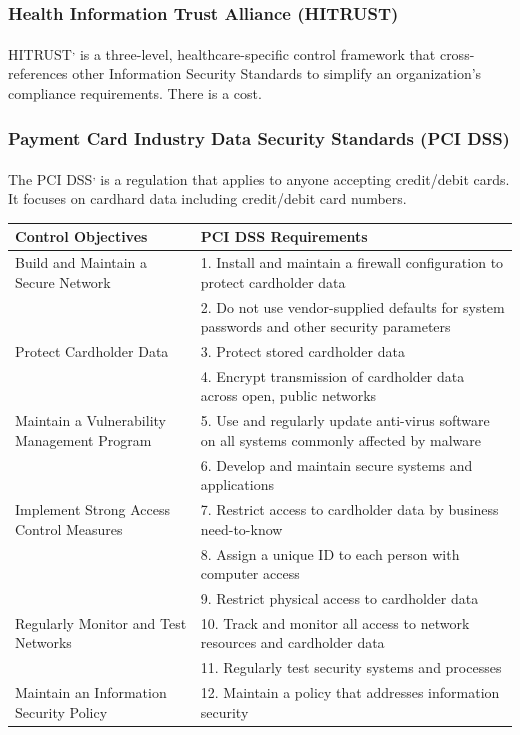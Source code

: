 \subsubsection{Health Information Trust Alliance (HITRUST)}
HITRUST\textsuperscript{,} is a three-level, healthcare-specific control framework that cross-references other Information Security Standards to simplify an organization’s compliance requirements. There is a cost.
\subsubsection{Payment Card Industry Data Security Standards (PCI DSS)} 
The PCI DSS\textsuperscript{,} is a regulation that applies to anyone accepting credit/debit cards. It focuses on cardhard data including credit/debit card numbers.
\newpage
\begin{table}\begin{center}\begin{tabular}{ | p{5cm} | p{9cm} | }\hline
Control Objectives & PCI DSS Requirements\\\hline
Build and Maintain a Secure Network	& 1. Install and maintain a firewall configuration to protect cardholder data\\
& 2. Do not use vendor-supplied defaults for system passwords and other security parameters\\\hline
Protect Cardholder Data	& 3. Protect stored cardholder data\\
& 4. Encrypt transmission of cardholder data across open, public networks\\\hline
Maintain a Vulnerability Management Program	& 5. Use and regularly update anti-virus software on all systems commonly affected by malware\\
& 6. Develop and maintain secure systems and applications\\\hline
Implement Strong Access Control Measures & 7. Restrict access to cardholder data by business need-to-know\\
& 8. Assign a unique ID to each person with computer access\\
& 9. Restrict physical access to cardholder data\\\hline
Regularly Monitor and Test Networks & 10. Track and monitor all access to network resources and cardholder data\\
& 11. Regularly test security systems and processes\\\hline
Maintain an Information Security Policy	& 12. Maintain a policy that addresses information security\\\hline
\end{tabular}\end{center}\end{table}
\newpage
